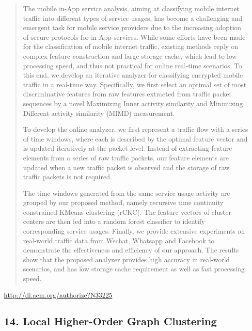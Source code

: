 \documentclass{article}
\begin{document}
\begin{quote}
The mobile in-App service analysis, aiming at classifying mobile internet traffic into different types of service usages, has become a challenging and emergent task for mobile service providers due to the increasing adoption of secure protocols for in-App services. While some efforts have been made for the classification of mobile internet traffic, existing methods reply on complex feature construction and large storage cache, which lead to low processing speed, and thus not practical for online real-time scenarios. To this end, we develop an iterative analyzer for classifying encrypted mobile traffic in a real-time way. Specifically, we first select an optimal set of most discriminative features from raw features extracted from traffic packet sequences by a novel Maximizing Inner activity similarity and Minimizing Different activity similarity (MIMD) measurement. 







  To develop the online analyzer, we first represent a traffic flow with a series of time windows, where each is described by the optimal feature vector and is updated iteratively at the packet level. Instead of extracting feature elements from a series of raw traffic packets, our feature elements are updated when a new traffic packet is observed and the storage of raw traffic packets is not required.







  The time windows generated from the same service usage activity are grouped by our proposed method, namely recursive time continuity constrained KMeans clustering (rCKC). The feature vectors of cluster centers are then fed into a random forest classifier to identify corresponding service usages. Finally, we provide extensive experiments on real-world traffic data from Wechat, Whatsapp and Facebook to demonstrate the effectiveness and efficiency of our approach. The results show that the proposed analyzer provides high accuracy in real-world scenarios, and has low storage cache requirement as well as fast processing speed.
\end{quote}

\href{http://dl.acm.org/authorize?N33225}{http://dl.acm.org/authorize?N33225}

\subsection{14. Local Higher-Order Graph Clustering}
\end{document}

